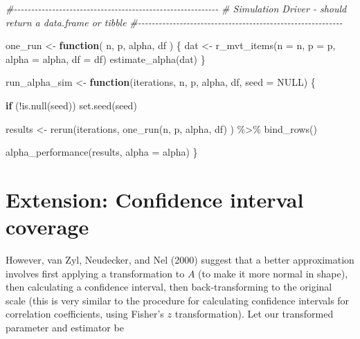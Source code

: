 \documentclass[
]{book}
\newenvironment{Shaded}{\begin{snugshade}}{\end{snugshade}}
\newcommand{\AttributeTok}[1]{\textcolor[rgb]{0.77,0.63,0.00}{#1}}
\newcommand{\CommentTok}[1]{\textcolor[rgb]{0.56,0.35,0.01}{\textit{#1}}}
\newcommand{\ConstantTok}[1]{\textcolor[rgb]{0.00,0.00,0.00}{#1}}
\newcommand{\ControlFlowTok}[1]{\textcolor[rgb]{0.13,0.29,0.53}{\textbf{#1}}}
\newcommand{\FunctionTok}[1]{\textcolor[rgb]{0.00,0.00,0.00}{#1}}
\newcommand{\NormalTok}[1]{#1}
\newcommand{\OtherTok}[1]{\textcolor[rgb]{0.56,0.35,0.01}{#1}}
\newcommand{\SpecialCharTok}[1]{\textcolor[rgb]{0.00,0.00,0.00}{#1}}
\begin{document}
\begin{Shaded}
\begin{Highlighting}[]
\CommentTok{\#{-}{-}{-}{-}{-}{-}{-}{-}{-}{-}{-}{-}{-}{-}{-}{-}{-}{-}{-}{-}{-}{-}{-}{-}{-}{-}{-}{-}{-}{-}{-}{-}{-}{-}{-}{-}{-}{-}{-}{-}{-}{-}{-}{-}{-}{-}{-}{-}{-}{-}{-}{-}{-}{-}{-}{-}{-}{-}{-}}
\CommentTok{\# Simulation Driver {-} should return a data.frame or tibble}
\CommentTok{\#{-}{-}{-}{-}{-}{-}{-}{-}{-}{-}{-}{-}{-}{-}{-}{-}{-}{-}{-}{-}{-}{-}{-}{-}{-}{-}{-}{-}{-}{-}{-}{-}{-}{-}{-}{-}{-}{-}{-}{-}{-}{-}{-}{-}{-}{-}{-}{-}{-}{-}{-}{-}{-}{-}{-}{-}{-}{-}{-}}


\NormalTok{one\_run }\OtherTok{\textless{}{-}} \ControlFlowTok{function}\NormalTok{( n, p, alpha, df ) \{}
\NormalTok{    dat }\OtherTok{\textless{}{-}} \FunctionTok{r\_mvt\_items}\NormalTok{(}\AttributeTok{n =}\NormalTok{ n, }\AttributeTok{p =}\NormalTok{ p, }\AttributeTok{alpha =}\NormalTok{ alpha, }\AttributeTok{df =}\NormalTok{ df)}
    \FunctionTok{estimate\_alpha}\NormalTok{(dat)}
\NormalTok{\}}


\NormalTok{run\_alpha\_sim }\OtherTok{\textless{}{-}} \ControlFlowTok{function}\NormalTok{(iterations, n, p, alpha, df, }\AttributeTok{seed =} \ConstantTok{NULL}\NormalTok{) \{}
  
  \ControlFlowTok{if}\NormalTok{ (}\SpecialCharTok{!}\FunctionTok{is.null}\NormalTok{(seed)) }\FunctionTok{set.seed}\NormalTok{(seed)}

\NormalTok{  results }\OtherTok{\textless{}{-}} 
    \FunctionTok{rerun}\NormalTok{(iterations, }\FunctionTok{one\_run}\NormalTok{(n, p, alpha, df) ) }\SpecialCharTok{\%\textgreater{}\%}
    \FunctionTok{bind\_rows}\NormalTok{()}
  
  \FunctionTok{alpha\_performance}\NormalTok{(results, }\AttributeTok{alpha =}\NormalTok{ alpha)}
\NormalTok{\}}
\end{Highlighting}
\end{Shaded}

\hypertarget{extension-confidence-interval-coverage}{%
\section{Extension: Confidence interval coverage}\label{extension-confidence-interval-coverage}}

However, van Zyl, Neudecker, and Nel (2000) suggest that a better approximation involves first applying a transformation to \(A\) (to make it more normal in shape), then calculating a confidence interval, then back-transforming to the original scale (this is very similar to the procedure for calculating confidence intervals for correlation coefficients, using Fisher's \(z\) transformation). Let our transformed parameter and estimator be
\end{document}
